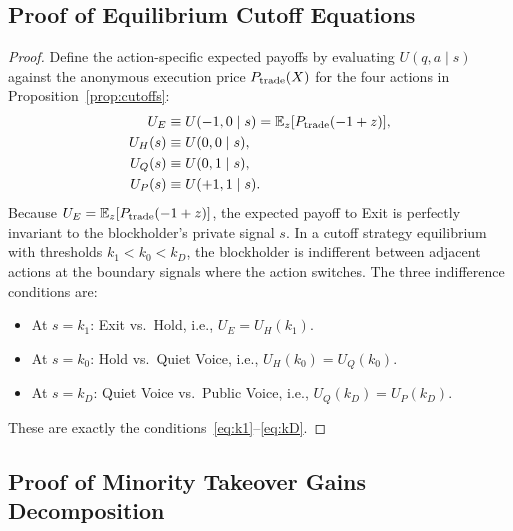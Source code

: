\documentclass[11pt]{article}
\newcommand{\E}{\mathbb{E}}
\newcommand{\1}{\mathbf{1}}
\begin{document}
\subsection{Proof of Equilibrium Cutoff Equations}
\label{app:proof-cutoff-eqns}

\begin{proof}
  Define the action-specific expected payoffs by evaluating $U(q,a \mid s)$ against the anonymous execution price $P_{\textup{trade}}(X)$ for the four actions in Proposition~\ref{prop:cutoffs}:
  \begin{align*}
  U_E &\equiv U(-1,0 \mid s) = \E_z[P_{\textup{trade}}(-1+z)], \\
  U_H(s) &\equiv U(0,0 \mid s), \\
  U_Q(s) &\equiv U(0,1 \mid s), \\
  U_P(s) &\equiv U(+1,1 \mid s).
  \end{align*}
  Because $U_E = \E_z[P_{\textup{trade}}(-1+z)]$, the expected payoff to Exit is perfectly invariant to the blockholder's private signal $s$.
In a cutoff strategy equilibrium with thresholds $k_1<k_0<k_D$, the blockholder is indifferent between adjacent actions at the boundary signals where the action switches. The three indifference conditions are:
\begin{itemize}[leftmargin=1.5em,itemsep=0pt]
\item At $s = k_1$: Exit vs.\ Hold, i.e., $U_E = U_H(k_1)$.
\item At $s = k_0$: Hold vs.\ Quiet Voice, i.e., $U_H(k_0) = U_Q(k_0)$.
\item At $s = k_D$: Quiet Voice vs.\ Public Voice, i.e., $U_Q(k_D) = U_P(k_D)$.
\end{itemize}
These are exactly the conditions~\eqref{eq:k1}--\eqref{eq:kD}.
\end{proof}

\subsection{Proof of Minority Takeover Gains Decomposition}
\label{app:proof-minority-decomp}
\end{document}
